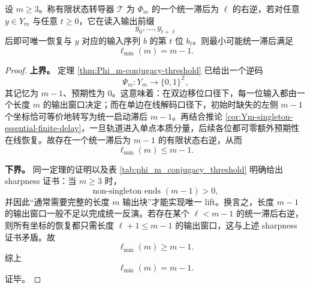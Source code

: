 \begin{theorem}[有限状态右逆的最小统一滞后]\label{thm:xi-time-part9zm-finite-state-right-inverse-minimal-lag}
设 \(m\ge 3\)。称有限状态转导器 \(\mathcal T\) 为 \(\Phi_m\) 的一个统一滞后为 \(\ell\) 的右逆，若对任意 \(y\in Y_m\) 与任意 \(t\ge 0\)，它在读入输出前缀
\[
y_0,\dots,y_{t+\ell}
\]
后即可唯一恢复与 \(y\) 对应的输入序列 \(b\) 的第 \(t\) 位 \(b_t\)。则最小可能统一滞后满足
\[
\ell_{\min}(m)=m-1.
\]
\end{theorem}
\begin{proof}
\textbf{上界。}
定理 \ref{thm:Phi_m-conjugacy-threshold} 已给出一个逆码
\[
\Psi_m:Y_m\to\{0,1\}^{\mathbb Z},
\]
其记忆为 \(m-1\)、预期性为 \(0\)。这意味着：在双边移位口径下，每一位输入都由一个长度 \(m\) 的输出窗口决定；而在单边在线解码口径下，初始时缺失的左侧 \(m-1\) 个坐标恰可等价地转写为统一启动滞后 \(m-1\)。再结合推论 \ref{cor:Ym-singleton-essential-finite-delay}，一旦轨道进入单点本质分量，后续各位都可零额外预期性在线恢复。故存在一个统一滞后为 \(m-1\) 的有限状态右逆，从而
\[
\ell_{\min}(m)\le m-1.
\]

\textbf{下界。}
同一定理的证明以及表 \ref{tab:phi_m_conjugacy_threshold} 明确给出 sharpness 证书：当 \(m\ge 3\) 时，
\[
\text{non-singleton ends }(m-1)>0,
\]
并因此“通常需要完整的长度 \(m\) 输出块”才能实现唯一 lift。换言之，长度 \(m-1\) 的输出窗口一般不足以完成统一反演。若存在某个 \(\ell<m-1\) 的统一滞后右逆，则所有坐标的恢复都只需长度 \(\ell+1\le m-1\) 的输出窗口，这与上述 sharpness 证书矛盾。故
\[
\ell_{\min}(m)\ge m-1.
\]
综上
\[
\ell_{\min}(m)=m-1.
\]
证毕。
\end{proof}

